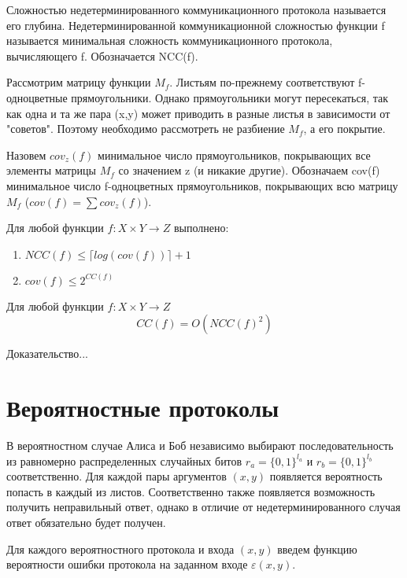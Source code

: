 \documentclass[12pt]{article}
\begin{document}
\begin{Def}
Сложностью недетерминированного коммуникационного протокола называется его глубина.
Недетерминированной коммуникационной сложностью функции f называется минимальная сложность коммуникационного протокола, вычисляющего f. Обозначается NCC(f).
\end{Def}

Рассмотрим матрицу функции $M_f$. Листьям по-прежнему соответствуют f-одноцветные прямоугольники.
Однако прямоугольники могут пересекаться, так как одна и та же пара (x,y) может приводить в разные листья в зависимости от "советов".
Поэтому необходимо рассмотреть не разбиение $M_f$, а его покрытие.

\begin{Def}
Назовем $cov_z(f)$ минимальное число прямоугольников,
покрывающих все элементы матрицы $M_f$ со значением z
(и никакие другие). Обозначаем cov(f) минимальное число f-одноцветных прямоугольников, покрывающих всю
матрицу $M_f$ ($cov(f) = \sum cov_z(f)$).
\end{Def}

\begin{Statement}
Для любой функции $f \colon X \times Y \rightarrow Z$ выполнено:
\begin{enumerate}
    \item
    $NCC(f) \leq \lceil log(cov(f)) \rceil + 1$
    \item
    $cov(f) \leq 2^{CC(f)}$
\end{enumerate}
\end{Statement}

\begin{Th}
    Для любой функции $f \colon X \times Y \rightarrow Z$
    $$CC(f) = O(NCC(f)^2)$$
\end{Th}
Доказательство...

\section{Вероятностные протоколы}
В вероятностном случае Алиса и Боб независимо выбирают последовательность из равномерно распределенных случайных битов
$r_a=\{0, 1\}^{l_a}$ и $r_b=\{0, 1\}^{l_b}$ соответственно. Для каждой пары аргументов $(x,y)$ появляется вероятность попасть в каждый из листов. Соответственно также появляется возможность получить неправильный ответ, однако в отличие от недетерминированного случая ответ обязательно будет получен.

\begin{Def}
Для каждого вероятностного протокола и входа $(x,y)$ введем функцию вероятности ошибки протокола на заданном входе $\varepsilon(x,y)$.
\end{Def}
\end{document}
